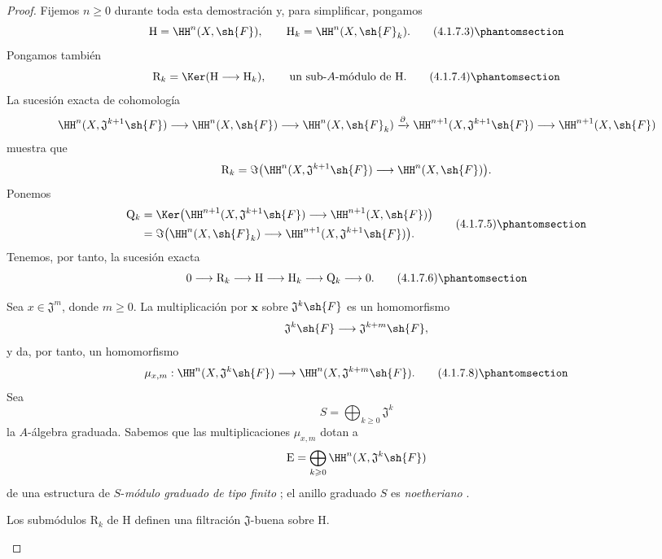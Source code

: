 \documentclass[oneside]{amsart}
\renewcommand{\geq}{\geqslant}
\let\EGAOriginalLabel\label
\renewcommand{\label}[1]{\phantomsection\EGAOriginalLabel{#1}}
\begin{document}
\begin{proof}
Fijemos $n\geq0$ durante toda esta demostración y, para simplificar,
pongamos
\[
  \mathrm{H}=\HH^n(X,\sh{F}),
  \qquad
  \mathrm{H}_k=\HH^n(X,\sh{F}_k).
  \tag{4.1.7.3}
  \label{III.4.1.7.3}
\]
Pongamos también
\[
  \mathrm{R}_k
  =
  \Ker(\mathrm{H}\longrightarrow\mathrm{H}_k),
  \qquad
  \text{un sub-$A$-módulo de $\mathrm{H}$.}
  \tag{4.1.7.4}
  \label{III.4.1.7.4}
\]
La sucesión exacta de cohomología
\[
  \HH^n(X,\mathfrak{J}^{k+1}\sh{F})
  \longrightarrow
  \HH^n(X,\sh{F})
  \longrightarrow
  \HH^n(X,\sh{F}_k)
  \xrightarrow{\partial}
  \HH^{n+1}(X,\mathfrak{J}^{k+1}\sh{F})
  \longrightarrow
  \HH^{n+1}(X,\sh{F})
\]
muestra que
\[
  \mathrm{R}_k
  =
  \Im\bigl(
    \HH^n(X,\mathfrak{J}^{k+1}\sh{F})
    \longrightarrow
    \HH^n(X,\sh{F})
  \bigr).
\]
Ponemos
\[
  \begin{split}
  \mathrm{Q}_k
  &=
  \Ker\bigl(
    \HH^{n+1}(X,\mathfrak{J}^{k+1}\sh{F})
    \longrightarrow
    \HH^{n+1}(X,\sh{F})
  \bigr)
  \\
  &=
  \Im\bigl(
    \HH^n(X,\sh{F}_k)
    \longrightarrow
    \HH^{n+1}(X,\mathfrak{J}^{k+1}\sh{F})
  \bigr).
  \end{split}
  \tag{4.1.7.5}
  \label{III.4.1.7.5}
\]
Tenemos, por tanto, la sucesión exacta
\[
  0\longrightarrow\mathrm{R}_k
  \longrightarrow\mathrm{H}
  \longrightarrow\mathrm{H}_k
  \longrightarrow\mathrm{Q}_k
  \longrightarrow0.
  \tag{4.1.7.6}
  \label{III.4.1.7.6}
\]

\begin{env}[4.1.7.7]
\label{III.4.1.7.7}
Sea $x\in\mathfrak{J}^m$, donde $m\geq0$.
La multiplicación por $\boldsymbol{x}$ sobre $\mathfrak{J}^k\sh{F}$ es un
homomorfismo
\[
  \mathfrak{J}^k\sh{F}
  \longrightarrow
  \mathfrak{J}^{k+m}\sh{F},
\]
y da, por tanto, un homomorfismo
\[
  \mu_{x,m}:
  \HH^n(X,\mathfrak{J}^k\sh{F})
  \longrightarrow
  \HH^n(X,\mathfrak{J}^{k+m}\sh{F}).
  \tag{4.1.7.8}
  \label{III.4.1.7.8}
\]
Sea
\[
  S=\bigoplus_{k\geq0}\mathfrak{J}^k
\]
la $A$-álgebra graduada.
Sabemos que las multiplicaciones $\mu_{x,m}$ dotan a
\[
  \mathrm{E}
  =
  \bigoplus_{k\geq0}
  \HH^n(X,\mathfrak{J}^k\sh{F})
\]
de una estructura de $S$-\emph{módulo graduado de tipo finito}
; el anillo graduado $S$ es \emph{noetheriano}
.
\end{env}

\begin{lemma}[4.1.7.9]
\label{III.4.1.7.9}
Los submódulos $\mathrm{R}_k$ de $\mathrm{H}$ definen una
filtración $\mathfrak{J}$-buena sobre $\mathrm{H}$.
\end{lemma}


\end{proof}
\end{document}
